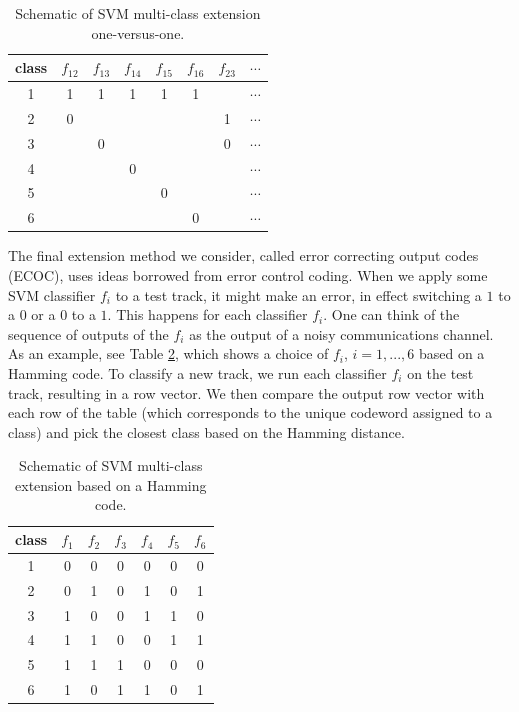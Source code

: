 \documentclass[12pt]{article}
\begin{document}
\begin{table}
   \centering
   \begin{tabular}{|c|ccccccc|}
      \hline
      class&$f_{12}$ & $f_{13}$ & $f_{14}$ & $f_{15}$ & $f_{16}$ & $f_{23}$ & $\cdots$ \\\hline
      1 & 1 & 1 & 1 & 1 & 1 &   & $\cdots$ \\\hline
      2 & 0 &   &   &   &   & 1 & $\cdots$ \\\hline
      3 &   & 0 &   &   &   & 0 & $\cdots$ \\\hline
      4 &   &   & 0 &   &   &   & $\cdots$ \\\hline
      5 &   &   &   & 0 &   &   & $\cdots$ \\\hline
      6 &   &   &   &   & 0 &   & $\cdots$ \\\hline
   \end{tabular}
   \caption{Schematic of SVM multi-class extension one-versus-one.}
   \label{tab:onevone}
\end{table}

The final extension method we consider, called error correcting output codes (ECOC), uses ideas borrowed from error control coding.  When we apply some SVM classifier $f_i$ to a test track, it might make an error, in effect switching a $1$ to a $0$ or a $0$ to a $1$.  This happens for each classifier $f_i$.  One can think of the sequence of outputs of the $f_i$ as the output of a noisy communications channel.  As an example, see Table \ref{tab:ecoc}, which shows a choice of $f_i$, $i=1,...,6$ based on a Hamming code.  To classify a new track, we run each classifier $f_i$ on the test track, resulting in a row vector.  We then compare the output row vector with each row of the table (which corresponds to the unique codeword assigned to a class) and pick the closest class based on the Hamming distance.\\

\begin{table}
   \centering
   \begin{tabular}{|c|cccccc|}
      \hline
      class&$f_{1}$ & $f_{2}$ & $f_{3}$ & $f_{4}$ & $f_{5}$ & $f_{6}$ \\\hline
      1 & 0 & 0 & 0 & 0 & 0 & 0 \\\hline
      2 & 0 & 1 & 0 & 1 & 0 & 1 \\\hline
      3 & 1 & 0 & 0 & 1 & 1 & 0 \\\hline
      4 & 1 & 1 & 0 & 0 & 1 & 1 \\\hline
      5 & 1 & 1 & 1 & 0 & 0 & 0 \\\hline
      6 & 1 & 0 & 1 & 1 & 0 & 1 \\\hline
   \end{tabular}
   \caption{Schematic of SVM multi-class extension based on a Hamming code.}
   \label{tab:ecoc}
\end{table}
\end{document}
